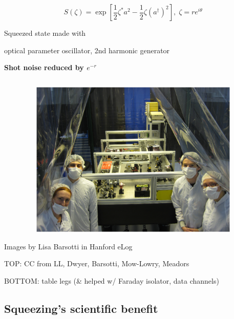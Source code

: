 \[
S(\zeta)=\exp[\frac{1}{2}\zeta^{*}a^{2}-\frac{1}{2}\zeta(a^{\dagger})^{2}],\;\zeta=re^{i\theta}
\]



Squeezed state made with


optical parameter oscillator, 2nd harmonic generator


\textbf{Shot noise reduced by $e^{-r}$}


\[
\]





\begin{figure}
\includegraphics[height=75mm, width=150mm]{lisabar-1289966130.eps}



\end{figure}

Images by Lisa Barsotti in Hanford eLog

TOP: CC from LL, Dwyer, Barsotti, Mow-Lowry, Meadors

BOTTOM: table legs (\& helped w/ Faraday isolator, data channels)



\subsection{Squeezing's scientific benefit}



